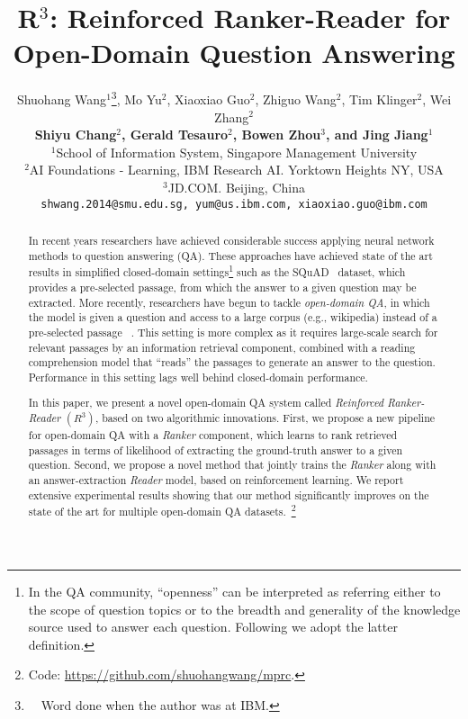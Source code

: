 \documentclass[letterpaper]{article} \usepackage{aaai18}  \usepackage{times}  \usepackage{helvet}  \usepackage{courier}  \usepackage{url}  \usepackage{graphicx}  \usepackage{comment}
\begin{document}
\title{R$^3$: Reinforced Ranker-Reader for Open-Domain Question Answering}

\author{ Shuohang Wang$^1$\thanks{~~Word done when the author was at IBM.}, Mo Yu$^2$, Xiaoxiao Guo$^2$, Zhiguo Wang$^2$, Tim Klinger$^2$, Wei Zhang$^2$\\
{ \bf \Large Shiyu Chang$^2$, Gerald Tesauro$^2$, Bowen Zhou$^3$, and Jing Jiang$^1$} \\
$^1${School of Information System, Singapore Management University}\\
$^2${AI Foundations - Learning, IBM Research AI. Yorktown Heights NY, USA}\\
$^3${JD.COM. Beijing, China}\\
{\texttt {shwang.2014@smu.edu.sg,
 yum@us.ibm.com,
xiaoxiao.guo@ibm.com}}
}
 
\maketitle
\begin{abstract}
In recent years researchers have achieved considerable success applying neural network methods to question answering (QA).  These approaches have achieved state of the art results in simplified closed-domain settings\footnote{In the QA community, ``openness'' can be interpreted as referring either to the scope of question topics or to the breadth and generality of the knowledge source used to answer each question. Following \cite{chen2017reading} we adopt the latter definition.} such as the SQuAD~\cite{rajpurkar2016squad} dataset, which provides a pre-selected passage, from which the answer to a given question may be extracted.  More recently, researchers have begun to tackle {\it open-domain QA}, in which the model is given a question and access to a large corpus (e.g., wikipedia) instead of a pre-selected passage ~\cite{chen2017reading}.
This setting is more complex as it requires large-scale search for relevant passages by an information retrieval component, combined with a reading comprehension model that
``reads'' the passages to generate an answer to the question.
Performance in this 
setting 
lags well behind closed-domain performance.

In this paper, we present a novel open-domain QA system called {\it{Reinforced Ranker-Reader}} 
$(R^3)$, based on two algorithmic innovations.  
First, we propose a new pipeline for open-domain QA with a \textit{Ranker} component, which learns to rank retrieved passages in terms of likelihood of extracting the ground-truth answer to a given question.
Second, we propose a novel method that jointly trains the \textit{Ranker} along with an answer-extraction \textit{Reader} model, based on reinforcement learning.
We report extensive experimental results showing that our method significantly improves on the state of the art for multiple open-domain QA datasets.~\footnote{Code:  \url{https://github.com/shuohangwang/mprc}. }
\end{abstract}
\end{document}
